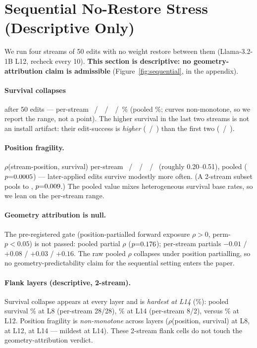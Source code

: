 \section{Sequential No-Restore Stress (Descriptive Only)}
\label{sec:sequential}

We run four streams of 50 edits with no weight restore between them
(Llama-3.2-1B L12, recheck every 10). \textbf{This section is descriptive: no
geometry-attribution claim is admissible} (Figure~\ref{fig:sequential}, in the appendix).

\paragraph{Survival collapses} after 50 edits --- per-stream
\seqSurvA{}~/~\seqSurvB{}~/~\seqSurvC{}~/~\seqSurvD{}\% (pooled
\seqSurvPooled{}\%; curves non-monotone, so we report the range, not a point).
The higher survival in the last two streams is not an install artifact: their
edit-success is \emph{higher} (\seqEsrC{}~/~\seqEsrD{}) than the first two
(\seqEsrA{}~/~\seqEsrB{}).

\paragraph{Position fragility.} $\rho$(stream-position, survival) per-stream
\seqPosA{}~/~\seqPosB{}~/~\seqPosC{}~/~\seqPosD{} (roughly 0.20--0.51), pooled
\seqPosPooled{} ($p{=}0.0005{}$) --- later-applied edits survive modestly
more often. (A 2-stream subset pools to \seqPosTwoStream{},
$p{=}0.009{}$.) The pooled value mixes heterogeneous survival base
rates, so we lean on the per-stream range.

\paragraph{Geometry attribution is null.} The pre-registered gate
(position-partialled forward \SxC{} exposure $\rho>0$, perm-$p<0.05$) is not
passed: pooled partial $\rho$ \seqHone{} ($p{=}0.176{}$); per-stream
partials $-0.01$ / $+0.08$ / $+0.03$ / $+0.16$. The raw pooled $\rho$ collapses
under position partialling, so no geometry-predictability claim for the
sequential setting enters the paper.

\paragraph{Flank layers (descriptive, 2-stream).} Survival collapse appears at
every layer and is \emph{hardest at L14} (\seqLfourteenSurv{}\%): pooled survival
\seqLeightSurv{}\% at L8 (per-stream 28/28), \seqLfourteenSurv{}\% at L14
(per-stream 8/2), versus \seqSurvPooled{}\% at L12. Position fragility is
\emph{non-monotone} across layers ($\rho$(position, survival) \seqLeightPos{} at
L8, \seqPosPooled{} at L12, \seqLfourteenPos{} at L14 --- mildest at L14). These
2-stream flank cells do not touch the geometry-attribution verdict.
